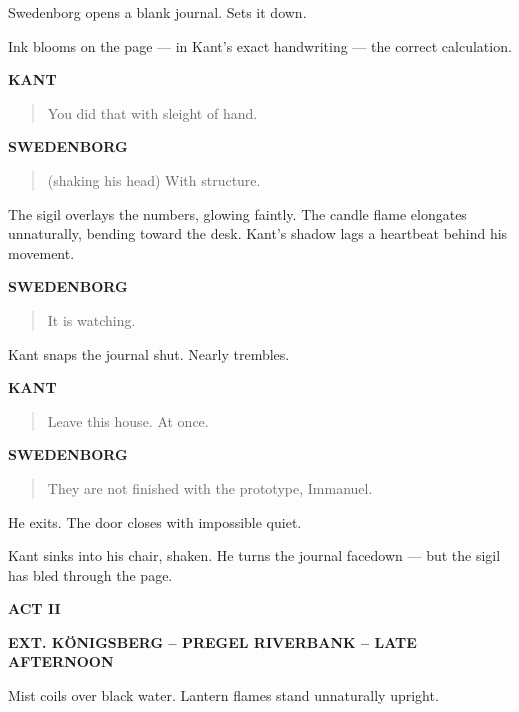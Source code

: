 \documentclass[12pt]{article}
\newcommand{\Scene}[1]{\vspace{1.2em}\textbf{#1}\vspace{0.8em}}
\newcommand{\Character}[1]{\vspace{0.8em}\textbf{#1}\vspace{0.4em}}
\newenvironment{Dialogue}{\begin{quote}\begin{RaggedRight}}{\end{RaggedRight}\end{quote}}
\newcommand{\Action}[1]{\vspace{0.4em}#1\vspace{0.4em}}
\begin{document}
\Action{Swedenborg opens a blank journal. Sets it down.}

\Action{Ink blooms on the page —  
in Kant’s exact handwriting —  
the correct calculation.}

\Character{KANT}
\begin{Dialogue}
You did that with sleight of hand.
\end{Dialogue}

\Character{SWEDENBORG}
\begin{Dialogue}
(shaking his head)  
With structure.
\end{Dialogue}

\Action{The sigil overlays the numbers, glowing faintly.  
The candle flame elongates unnaturally, bending toward the desk.  
Kant's shadow lags a heartbeat behind his movement.}

\Character{SWEDENBORG}
\begin{Dialogue}
It is watching.
\end{Dialogue}

\Action{Kant snaps the journal shut. Nearly trembles.}

\Character{KANT}
\begin{Dialogue}
Leave this house.  
At once.
\end{Dialogue}

\Character{SWEDENBORG}
\begin{Dialogue}
They are not finished with the prototype, Immanuel.
\end{Dialogue}

\Action{He exits. The door closes with impossible quiet.}

\Action{Kant sinks into his chair, shaken.  
He turns the journal facedown —  
but the sigil has bled through the page.}


\newpage
\begin{center}
{\Large\bfseries ACT II}
\end{center}
\newpage


\Scene{EXT. KÖNIGSBERG – PREGEL RIVERBANK – LATE AFTERNOON}

\Action{Mist coils over black water. Lantern flames stand unnaturally upright.}
\end{document}
